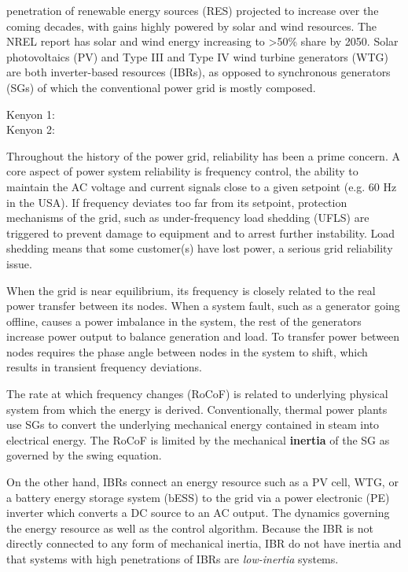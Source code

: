  penetration of renewable energy sources (RES)
projected to increase over the coming decades, with gains highly powered by
solar and wind resources. The NREL report %
has solar and wind energy increasing to >50\% share by 2050. 
Solar photovoltaics (PV) and Type III and Type IV wind turbine generators
(WTG) are both inverter-based resources (IBRs), as opposed to synchronous
generators (SGs) of which the conventional power grid is mostly composed.

Kenyon 1: \cite{kenyon_criticality_2023}\\
Kenyon 2: \cite{kenyon_interactive_2023}


Throughout the history of the power grid, reliability has been a prime concern.
A core aspect of power system reliability is frequency control, the ability
to maintain the AC voltage and current signals close to a given setpoint
(e.g. 60 Hz in the USA). If frequency deviates too far from its setpoint,
protection mechanisms of the grid, such as under-frequency load shedding
(UFLS) are triggered to prevent damage to equipment and to arrest further
instability.  %
Load shedding means that some customer(s) have lost power, a serious grid
reliability issue.

When the grid is near equilibrium, its frequency is closely related
to the real power transfer between its nodes. When a system fault, such as a
generator going offline, causes a power imbalance in the system, 
the rest of the generators increase power output to balance
generation and load. To transfer power between nodes requires the phase angle
between nodes in the system to shift, which results in transient frequency
deviations.

The rate at which frequency changes (RoCoF) is related to underlying physical
system from which the energy is derived. Conventionally,
thermal power plants use SGs to convert the underlying mechanical energy
contained in steam into electrical energy. The RoCoF is limited by
the mechanical {\bf inertia} of the SG as governed by the swing equation.

On the other hand, IBRs connect an energy resource such as a PV cell,
WTG, or a battery energy storage system (bESS) to the grid via a 
power electronic (PE) inverter which converts a DC source to an AC output.
The dynamics governing the energy resource as well as the control algorithm.
Because the IBR is not directly connected to any form of mechanical inertia,
IBR do not have inertia and that systems with high penetrations of IBRs
are {\it low-inertia} systems. \cite[text]{}

